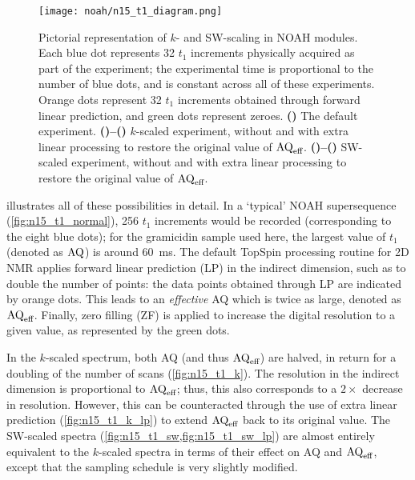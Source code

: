 \begin{figure}[!ht]
    \centering
    \texttt{[image: noah/n15\_t1\_diagram.png]}%
    {\label{fig:n15_t1_normal}}%
    {\label{fig:n15_t1_k}}%
    {\label{fig:n15_t1_k_lp}}%
    {\label{fig:n15_t1_sw}}%
    {\label{fig:n15_t1_sw_lp}}%
    \caption[Pictorial representation of $k$- and SW-scaling in NOAH \nitrogen{} modules]{
        Pictorial representation of $k$- and SW-scaling in NOAH \nitrogen{} modules.
        Each blue dot represents 32 $t_1$ increments physically acquired as part of the experiment; the experimental time is proportional to the number of blue dots, and is constant across all of these experiments.
        Orange dots represent 32 $t_1$ increments obtained through forward linear prediction, and green dots represent zeroes.
        \textbf{()} The default experiment.
        \textbf{()--()} $k$-scaled experiment, without and with extra linear processing to restore the original value of $\text{AQ}_\text{eff}$.
        \textbf{()--()} SW-scaled experiment, without and with extra linear processing to restore the original value of $\text{AQ}_\text{eff}$.
    }
    \label{fig:n15_t1}
\end{figure}

 illustrates all of these possibilities in detail.
In a `typical' NOAH supersequence (\cref{fig:n15_t1_normal}), 256 $t_1$ increments would be recorded (corresponding to the eight blue dots);
for the gramicidin sample used here, the largest value of $t_1$ (denoted as $\text{AQ}$) is around \qty{60}{\ms}.
The default TopSpin processing routine for 2D NMR applies forward linear prediction (LP)\autocite{Ni1986JMR,Tirendi1989JMR,Led1991CR,Koehl1999PNMRS} in the indirect dimension, such as to double the number of points: the data points obtained through LP are indicated by orange dots.
This leads to an \textit{effective} AQ which is twice as large, denoted as $\text{AQ}_\text{eff}$.
Finally, zero filling (ZF) is applied to increase the digital resolution to a given value, as represented by the green dots.

In the $k$-scaled spectrum, both AQ (and thus $\text{AQ}_\text{eff}$) are halved, in return for a doubling of the number of scans (\cref{fig:n15_t1_k}).
The resolution in the indirect dimension is proportional to $\text{AQ}_\text{eff}$; thus, this also corresponds to a $2\times$ decrease in resolution.
However, this can be counteracted through the use of extra linear prediction (\cref{fig:n15_t1_k_lp}) to extend $\text{AQ}_\text{eff}$ back to its original value.
The SW-scaled spectra (\cref{fig:n15_t1_sw,fig:n15_t1_sw_lp}) are almost entirely equivalent to the $k$-scaled spectra in terms of their effect on AQ and $\text{AQ}_\text{eff}$, except that the sampling schedule is very slightly modified.

